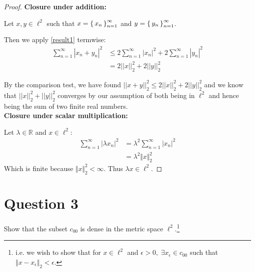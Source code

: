 \documentclass[dvipsnames,12pt]{exam}
\newcommand{\R}{{\mathbb{R}}}
\newcommand{\norm}[1]{\Vert #1 \Vert}
\theoremstyle{definition}
\begin{document}
\newpage
\begin{proof}
    \textbf{Closure under addition:}

    Let $x, y \in \ell^2$ such that $x = \set{x_n}^\infty_{n=1}$ and $y = \set{y_n}^\infty_{n=1}$.

    Then we apply \ref{result1} termwise:
    \begin{align*}
        \sum_{n=1}^\infty |x_n + y_ n |^2 &\leq 2\sum^\infty_{n=1} |x_n|^2 +2\sum^\infty_{n=1}|y_n|^2 \\
        &= 2||x||_2^2 + 2||y||_2^2
    \end{align*}

    By the comparison test, we have found $||x+y||_2^2 \leq 2||x||_2^2+2||y||_2^2$ and we know that $||x||_2^2 + ||y||_2^2$ converges by our assumption of both being in $\ell^2$ and hence being the sum of two finite real numbers.\\

    \textbf{Closure under scalar multiplication:}

    Let $\lambda \in \R$ and $x\in\ell^2$:
    \begin{align*}
        \sum^\infty_{n=1}|\lambda x_n |^2 &= \lambda^2 \sum^\infty_{n=1} |x_n|^2 \\ 
        &= \lambda^2 \norm{x}_2^2
    \end{align*}
    Which is finite because $\norm{x}^2_2 < \infty$. Thus $\lambda x \in \ell^2$.

\end{proof}

\newpage
\section{Question 3}
Show that the subset $c_{00}$ is dense in the metric space $\ell^2$.\footnote{ i.e. we wish to show that for $x\in \ell^2$ and $\epsilon > 0, \; \exists x_\epsilon \in c_{00}$ such that $\norm{x-x_\epsilon}_2 < \epsilon$.}
\end{document}
